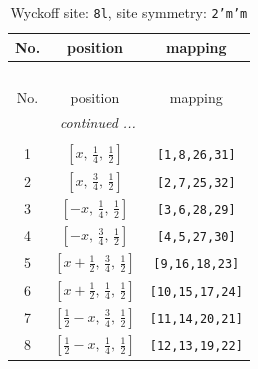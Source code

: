 \documentclass[fleqn,8pt]{jsarticle}
\begin{document}
\begin{longtable}{ccc}
\caption{Wyckoff site: {\tt 8l}, site symmetry: {\tt 2'm'm}}
 \\
 \hline \hline
No. & position & mapping \\ \hline \endfirsthead

\multicolumn{2}{l}{\tablename\ \thetable{}} \\
 \hline \hline
No. & position & mapping \\ \hline \endhead

 \hline \hline
\multicolumn{2}{r}{\footnotesize\it continued ...} \\ \endfoot

 \hline \hline
\multicolumn{2}{r}{} \\ \endlastfoot

1 & $\left[ x,\, \frac{1}{4},\, \frac{1}{2} \right]$ & {\tt [1,8,26,31]} \\ \hline
2 & $\left[ x,\, \frac{3}{4},\, \frac{1}{2} \right]$ & {\tt [2,7,25,32]} \\ \hline
3 & $\left[ - x,\, \frac{1}{4},\, \frac{1}{2} \right]$ & {\tt [3,6,28,29]} \\ \hline
4 & $\left[ - x,\, \frac{3}{4},\, \frac{1}{2} \right]$ & {\tt [4,5,27,30]} \\ \hline
5 & $\left[ x + \frac{1}{2},\, \frac{3}{4},\, \frac{1}{2} \right]$ & {\tt [9,16,18,23]} \\ \hline
6 & $\left[ x + \frac{1}{2},\, \frac{1}{4},\, \frac{1}{2} \right]$ & {\tt [10,15,17,24]} \\ \hline
7 & $\left[ \frac{1}{2} - x,\, \frac{3}{4},\, \frac{1}{2} \right]$ & {\tt [11,14,20,21]} \\ \hline
8 & $\left[ \frac{1}{2} - x,\, \frac{1}{4},\, \frac{1}{2} \right]$ & {\tt [12,13,19,22]} \\
\end{longtable}
\renewcommand{\arraystretch}{1.2}
\end{document}
